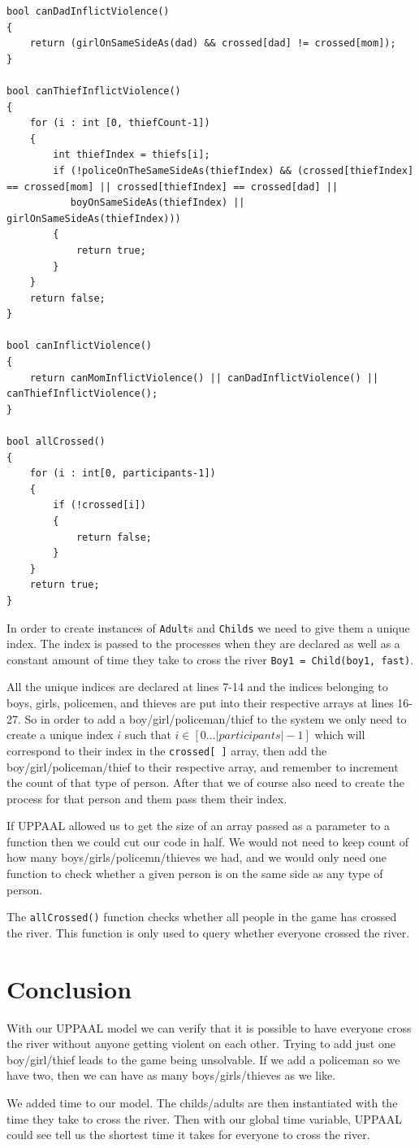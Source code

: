\documentclass[a4paper,12pt]{article}
\begin{document}
\begin{lstlisting}[caption={Global declarations}]
bool canDadInflictViolence()
{
    return (girlOnSameSideAs(dad) && crossed[dad] != crossed[mom]);
}

bool canThiefInflictViolence()
{
    for (i : int [0, thiefCount-1])
    {
        int thiefIndex = thiefs[i];
        if (!policeOnTheSameSideAs(thiefIndex) && (crossed[thiefIndex] == crossed[mom] || crossed[thiefIndex] == crossed[dad] ||
           boyOnSameSideAs(thiefIndex) || girlOnSameSideAs(thiefIndex)))
        {
            return true;
        }
    }
    return false;
}

bool canInflictViolence()
{
    return canMomInflictViolence() || canDadInflictViolence() || canThiefInflictViolence();
}

bool allCrossed()
{
    for (i : int[0, participants-1])
    {
        if (!crossed[i])
        {
            return false;
        }
    }
    return true;
}
\end{lstlisting}

In order to create instances of \lstinline|Adult|s and \lstinline|Childs| we need to give them a unique index. The index is passed to the processes when they are declared as well as a constant amount of time they take to cross the river \lstinline|Boy1 = Child(boy1, fast)|.

All the unique indices are declared at lines 7-14 and the indices belonging to boys, girls, policemen, and thieves are put into their respective arrays at lines 16-27. So in order to add a boy/girl/policeman/thief to the system we only need to create a unique index $i$ such that $i \in [0 ... |participants|-1]$ which will correspond to their index in the \lstinline|crossed[ ]| array, then add the boy/girl/policeman/thief to their respective array, and remember to increment the count of that type of person. After that we of course also need to create the process for that person and them pass them their index.

If UPPAAL allowed us to get the size of an array passed as a parameter to a function then we could cut our code in half. We would not need to keep count of how many boys/girls/policemn/thieves we had, and we would only need one function to check whether a given person is on the same side as any type of person.

The \lstinline|allCrossed()| function checks whether all people in the game has crossed the river. This function is only used to query whether everyone crossed the river.

\section*{Conclusion}

With our UPPAAL model we can verify that it is possible to have everyone cross the river without anyone getting violent on each other. Trying to add just one boy/girl/thief leads to the game being unsolvable. If we add a policeman so we have two, then we can have as many boys/girls/thieves as we like.

We added time to our model. The childs/adults are then instantiated with the time they take to cross the river. Then with our global time variable, UPPAAL could see tell us the shortest time it takes for everyone to cross the river.
\end{document}
